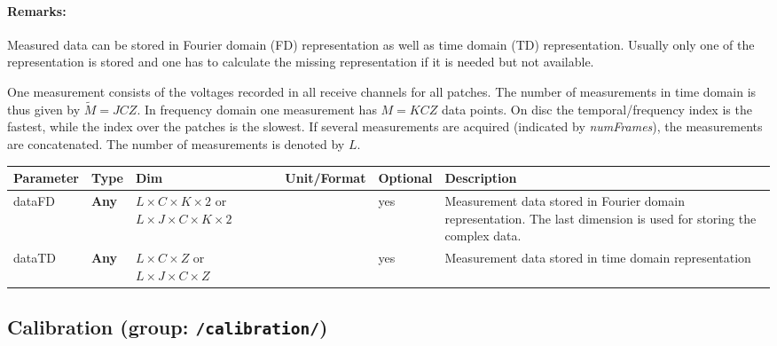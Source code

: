 \documentclass[landscape]{article} %
\newcommand{\inl}[1]{\lstinline[columns=fixed]{#1}}
\newcommand{\inltab}[1]{{\ttfamily\bfseries\color{blue}#1}}
\newcommand{\inlvar}[1]{{\ttfamily#1}}
\begin{document}
\begin{multicols}{2}

\paragraph{Remarks:} 
Measured data can be stored in Fourier domain (FD) representation as well as time domain (TD) representation. Usually only one of the representation is stored and one has to calculate the missing representation if it is needed but not available.

One measurement consists of the voltages recorded in all receive channels for all patches. The number of measurements in time domain is thus given by $\widetilde{M} = J C Z$. In frequency domain one measurement has $M = K C Z$ data points. On disc the temporal/frequency index is the fastest, while the index over the patches is the slowest. If several measurements are acquired (indicated by \textit{numFrames}), the measurements are concatenated. The number of measurements is denoted by $L$. \newline

\end{multicols}

\noindent \begin{tabularx}{\columnwidth}{llp{3cm}llX} 
\textbf{Parameter} & \textbf{Type} & \textbf{Dim} & \textbf{Unit/Format} & \textbf{Optional} & \textbf{Description} \\ \hline 
\inlvar{dataFD} & \inltab{Any} & $L \times C \times K \times 2$  or $L \times J \times C \times K \times 2$  & & yes & Measurement data stored in Fourier domain representation. The last dimension is used for storing the complex data. \\  \hline
\inlvar{dataTD} & \inltab{Any} & $L \times C \times Z$ or \newline $L \times J \times C \times Z$ & & yes & Measurement data stored in time domain representation \\ \hline 
\end{tabularx}

\newpage
\subsection{Calibration (group: \inl{/calibration/})}
\end{document}
